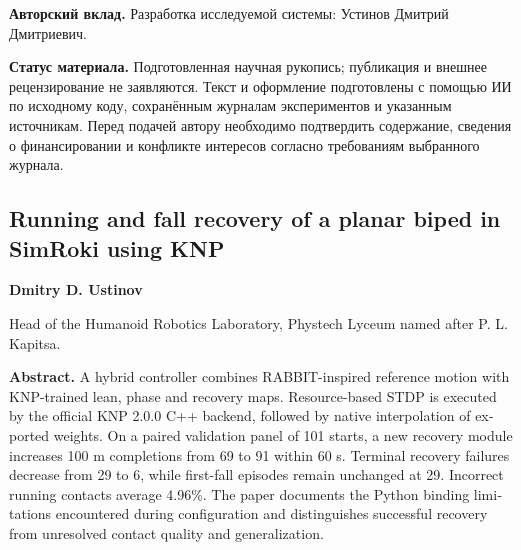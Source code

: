 \documentclass[11pt,a4paper]{article}
\begin{document}
\vspace{5pt}
\noindent\textbf{Авторский вклад.} Разработка исследуемой системы: Устинов Дмитрий Дмитриевич.\par
\noindent\textbf{Статус материала.} Подготовленная научная рукопись; публикация и внешнее рецензирование не заявляются. Текст и оформление подготовлены с помощью ИИ по исходному коду, сохранённым журналам экспериментов и указанным источникам. Перед подачей автору необходимо подтвердить содержание, сведения о финансировании и конфликте интересов согласно требованиям выбранного журнала.

\begin{otherlanguage}{english}
\section*{Running and fall recovery of a planar biped in SimRoki using KNP}
\noindent\textbf{Dmitry D. Ustinov}\par
\noindent Head of the Humanoid Robotics Laboratory, Phystech Lyceum named after P. L. Kapitsa.\par
\noindent\textbf{Abstract.} A hybrid controller combines RABBIT-inspired reference motion with KNP-trained lean, phase and recovery maps. Resource-based STDP is executed by the official KNP 2.0.0 C++ backend, followed by native interpolation of exported weights. On a paired validation panel of 101 starts, a new recovery module increases 100 m completions from 69 to 91 within 60 s. Terminal recovery failures decrease from 29 to 6, while first-fall episodes remain unchanged at 29. Incorrect running contacts average 4.96\%. The paper documents the Python binding limitations encountered during configuration and distinguishes successful recovery from unresolved contact quality and generalization.
\end{otherlanguage}
\end{document}

